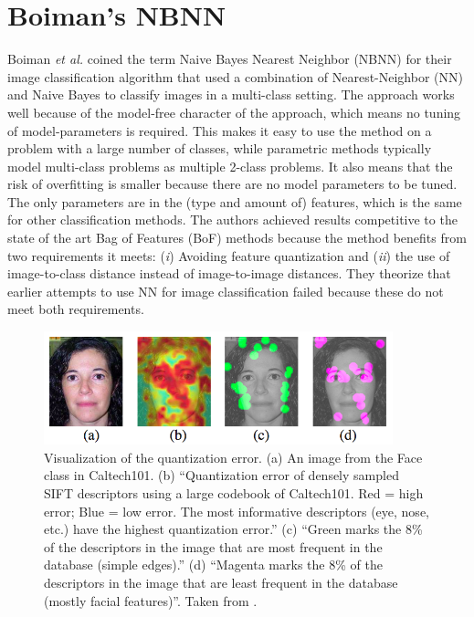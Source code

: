 \section{Boiman's NBNN} %
\label{sub:boiman_s_nbnn}
Boiman \emph{et al.} \cite{boiman2008defense} coined the term Naive Bayes Nearest Neighbor (NBNN) for their image classification algorithm that used a combination of Nearest-Neighbor (NN) and Naive Bayes to classify images in a multi-class setting. The approach works well because of the model-free character of the approach, which means no tuning of model-parameters is required. This makes it easy to use the method on a problem with a large number of classes, while parametric methods typically model multi-class problems as multiple 2-class problems. It also means that the risk of overfitting is smaller because there are no model parameters to be tuned. The only parameters are in the (type and amount of) features, which is the same for other classification methods. The authors achieved results competitive to the state of the art Bag of Features (BoF) methods because the method benefits from two requirements it meets: (\emph{i}) Avoiding feature quantization and (\emph{ii}) the use of image-to-class distance instead of image-to-image distances. They theorize that earlier attempts to use NN \cite{berg2005shape, zhang2006svm} for image classification failed because these do not meet both requirements.

\begin{figure}[hbt]
    \centering
    \includegraphics[width=0.9\textwidth]{QuantizationError}
    \caption{Visualization of the quantization error. (a) An image from the Face class in Caltech101. \cite{caltech101} (b) ``Quantization error of densely sampled SIFT descriptors using a large codebook of Caltech101. Red = high error; Blue = low error. The most informative descriptors (eye, nose, etc.) have the highest quantization error.'' (c) ``Green marks the 8\% of the descriptors in the image that are most frequent in the database (simple edges).'' (d) ``Magenta marks the 8\% of the descriptors in the image that are least frequent in the database (mostly facial features)''. Taken from \cite{boiman2008defense}.}
    \label{fig:quantization_error}
\end{figure}

